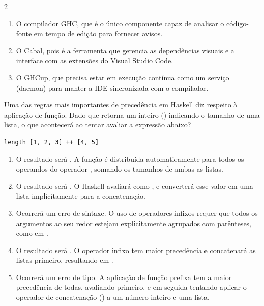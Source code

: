 \documentclass[a4paper,10pt,brazil]{article}
\begin{document}
\begin{multicols}{2}
\begin{enumerate}
  \item O compilador GHC, que é o único componente capaz de analisar o código-fonte em tempo de edição para fornecer avisos.

  \item O Cabal, pois é a ferramenta que gerencia as dependências visuais e a interface com as extensões do Visual Studio Code.

  \item O GHCup, que precisa estar em execução contínua como um serviço (daemon) para manter a IDE sincronizada com o compilador.


\end{enumerate}

Uma das regras mais importantes de precedência em Haskell diz respeito à aplicação de função. Dado que  retorna um inteiro () indicando o tamanho de uma lista, o que acontecerá ao tentar avaliar a expressão abaixo?
\begin{verbatim}
length [1, 2, 3] ++ [4, 5]
\end{verbatim}

\begin{enumerate}
  \item O resultado será . A função  é distribuída automaticamente para todos os operandos do operador \haskellinline{++}, somando os tamanhos de ambas as listas.

  \item O resultado será \haskellinline{[3, 4, 5]}. O Haskell avaliará  como , e converterá esse valor em uma lista implicitamente para a concatenação.

  \item Ocorrerá um erro de sintaxe. O uso de operadores infixos requer que todos os argumentos ao seu redor estejam explicitamente agrupados com parênteses, como em .

  \item O resultado será . O operador infixo \haskellinline{++} tem maior precedência e concatenará as listas primeiro, resultando em .

  \item Ocorrerá um erro de tipo. A aplicação de função prefixa tem a maior precedência de todas, avaliando  primeiro, e em seguida tentando aplicar o operador de concatenação (\haskellinline{++}) a um número inteiro e uma lista.



\end{enumerate}
\end{multicols}
\end{document}
